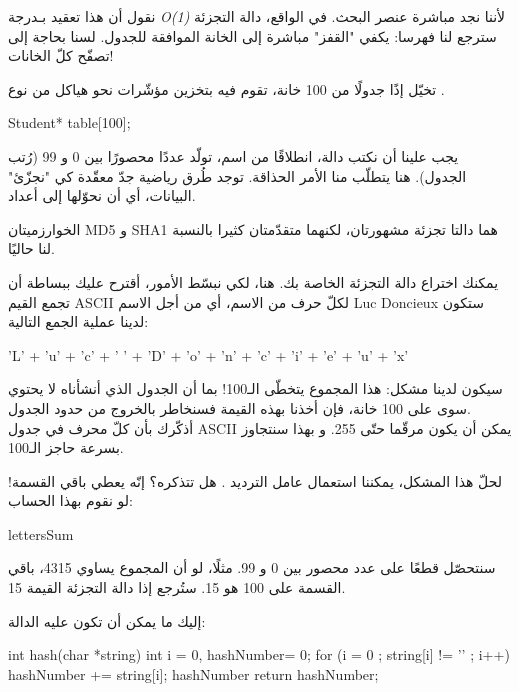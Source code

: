 \begin{information}
نقول أن هذا تعقيد بـدرجة
\textit{\textenglish{O(1)}}
لأننا نجد مباشرة عنصر البحث. في الواقع، دالة التجزئة سترجع لنا فهرسا: يكفي "القفز" مباشرة إلى الخانة الموافقة للجدول. لسنا بحاجة إلى تصفّح كلّ الخانات!
\end{information}

تخيّل إذًا جدولًا من 100 خانة، تقوم فيه بتخزين مؤشّرات نحو هياكل من نوع
.

\begin{Csource}
Student* table[100];
\end{Csource}

يجب علينا أن نكتب دالة، انطلاقًا من اسم، تولّد عددًا محصورًا بين 0 و 99 (رُتب الجدول). هنا يتطلّب منا الأمر الحذاقة. توجد طُرق رياضية جدّ معقّدة كي "نجزّئ" البيانات، أي أن نحوّلها إلى أعداد.

\begin{information}
الخوارزميتان
\textenglish{MD5}
و
\textenglish{SHA1}
هما دالتا تجزئة مشهورتان، لكنهما متقدّمتان كثيرا بالنسبة لنا حاليًا.
\end{information}

يمكنك اختراع دالة التجزئة الخاصة بك. هنا، لكي نبسّط الأمور، أقترح عليك ببساطة أن تجمع القيم
\textenglish{ASCII}
لكلّ حرف من الاسم، أي من أجل الاسم
\textenglish{Luc Doncieux}
ستكون لدينا عملية الجمع التالية:

\begin{Csource}
'L' + 'u' + 'c' + ' ' + 'D' + 'o' + 'n' + 'c' + 'i' + 'e' + 'u' + 'x'
\end{Csource}

سيكون لدينا مشكل: هذا المجموع يتخطّى الـ100! بما أن الجدول الذي أنشأناه لا يحتوي سوى على 100 خانة، فإن أخذنا بهذه القيمة فسنخاطر بالخروج من حدود الجدول.\\
أذكّرك بأن كلّ محرف في جدول
\textenglish{ASCII}
يمكن أن يكون مرقّما حتّى 255. و بهذا سنتجاوز بسرعة حاجز الـ100.

لحلّ هذا المشكل، يمكننا استعمال عامل الترديد
\InlineCode{\%}.
هل تتذكره؟ إنّه يعطي باقي القسمة! لو نقوم بهذا الحساب:

\begin{Csource}
lettersSum %
\end{Csource}

سنتحصّل قطعًا على عدد محصور بين 0 و 99. مثلًا، لو أن المجموع يساوي 4315، باقي القسمة على 100 هو 15. ستُرجع إذا دالة التجزئة القيمة 15.

إليك ما يمكن أن تكون عليه الدالة:

\begin{Csource}
int hash(char *string)
{
	int i = 0, hashNumber= 0;
	for (i = 0 ; string[i] != '\0' ; i++)
	{
		hashNumber += string[i];
	}
	hashNumber %
	return hashNumber;
}
\end{Csource}

